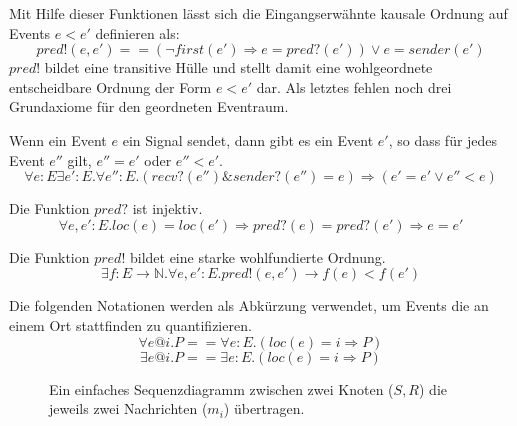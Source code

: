 Mit Hilfe dieser Funktionen lässt sich die Eingangserwähnte kausale Ordnung auf Events
$e < e'$ definieren als:
\[
  pred!(e,e') == (\neg first(e')\Rightarrow e = pred?(e')) \vee e = sender(e')
\]
$pred!$ bildet eine transitive Hülle und stellt damit eine wohlgeordnete
entscheidbare Ordnung der Form $e < e'$ dar. Als letztes fehlen noch
drei Grundaxiome für den geordneten Eventraum.~\cite{bickford2005causal}

\begin{axiom}
  Wenn ein Event $e$ ein Signal sendet, dann gibt es ein Event $e'$, so dass für
  jedes Event $e''$ gilt, $e'' = e'$ oder $e'' < e'$.\\
  \[
    \forall e:E \exists e':E. \forall e'':E . (recv?(e'') \& sender?(e'')=e)\Rightarrow (e' = e' \vee e'' < e)
  \]
\end{axiom}

\begin{axiom}
  Die Funktion $pred?$ ist injektiv.
  \[
    \forall e,e':E.loc(e) = loc(e')\Rightarrow pred?(e) = pred?(e')\Rightarrow e=e'
  \]
\end{axiom}

\begin{axiom}
  Die Funktion $pred!$ bildet eine starke wohlfundierte Ordnung.
  \[
    \exists f:E\rightarrow \mathbb{N}.\forall e,e':E.pred!(e,e')\rightarrow f(e)<f(e')
  \]
\end{axiom}

\begin{defi}
  Die folgenden Notationen werden als Abkürzung verwendet, um Events die an einem
  Ort stattfinden zu quantifizieren.
  \[
    \forall e@i.P == \forall e:E.(loc(e) = i\Rightarrow P)
  \]
  \[
    \exists e@i.P == \exists e:E.(loc(e) = i\Rightarrow P)
  \]
\end{defi}

\begin{figure}
  \center
  \label{fig:sequence}
  \caption{Ein einfaches Sequenzdiagramm zwischen zwei Knoten ($S,R$) die jeweils
    zwei Nachrichten ($m_i$) übertragen.}
\end{figure}

